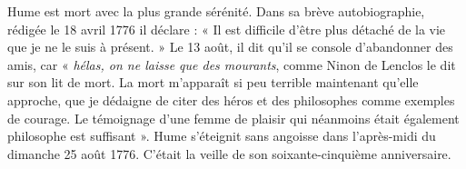 Hume est mort avec la plus grande sérénité.
Dans sa brève autobiographie, rédigée le 18 avril 1776
il déclare : « Il est difficile d’être plus détaché de la
vie que je ne le suis à présent. » Le 13 août, il dit qu'il
se console d’abandonner des amis, car « {\it hélas, on
ne laisse que des mourants}, comme Ninon de Lenclos
le dit sur son lit de mort. La mort m'apparaît si
peu terrible maintenant qu’elle approche, que je
dédaigne de citer des héros et des philosophes comme
exemples de courage. Le témoignage d’une femme de
plaisir qui néanmoins était également philosophe
est suffisant ». Hume s’éteignit sans angoisse dans
l'après-midi du dimanche 25 août 1776. C’était la
veille de son soixante-cinquième anniversaire.
